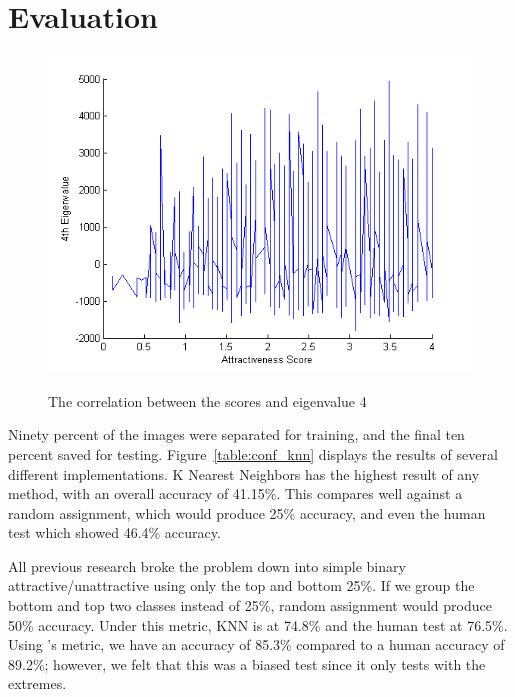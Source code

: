 \documentclass[10pt,twocolumn,letterpaper]{article}
\begin{document}
\section{Evaluation}

\begin {figure} [h]
    \centering
        \includegraphics[width = \linewidth]{eigen4_graph.png}
    \label{fig:corgraph}
    \caption{The correlation between the scores and eigenvalue 4}
\end {figure}

Ninety percent of the images were separated for training, and the final ten percent saved for testing. Figure~\ref{table:conf_knn} displays the results of several different implementations. K Nearest Neighbors has the highest result of any method, with an overall accuracy of 41.15\%. This compares well against a random assignment, which would produce 25\% accuracy, and even the human test which showed 46.4\% accuracy.

All previous research broke the problem down into simple binary attractive/unattractive using only the top and bottom 25\%. If we group the bottom and top two classes instead of 25\%, random assignment would produce 50\% accuracy. Under this metric, KNN is at 74.8\% and the human test at 76.5\%. Using \cite{eisenthal2006facial, kagian2006humanlike, kagian2008machine, dataset}'s metric, we have an accuracy of 85.3\% compared to a human accuracy of 89.2\%; however, we felt that this was a biased test since it only tests with the extremes. 
\end{document}
